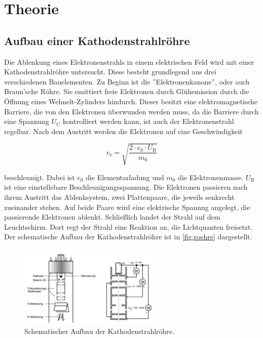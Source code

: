 \section{Theorie}
\label{sec:Theorie}




\subsection{Aufbau einer Kathodenstrahlröhre}
\label{ssec:t1}

Die Ablenkung eines Elektronenstrahls in einem elektrischen Feld wird mit einer Kathodenstrahlröhre untersucht.
Diese besteht grundlegend aus drei verschiedenen Bauelementen.
Zu Beginn ist die ''Elektronenkanone'', oder auch Braun'sche Röhre. Sie emittiert freie Elektronen durch Glühemission durch die Öffnung eines Wehnelt-Zylinders hindurch.
Dieser besitzt eine elektromagnetische Barriere, die von den Elektronen überwunden werden muss, da die Barriere durch eine Spannung $U_\text{C}$ kontrolliert werden kann, ist auch der Elektronenstrahl regelbar.
Nach dem Austritt werden die Elektronen auf eine Geschwindigkeit 

\begin{equation}
    v_\text{z} = \sqrt{\frac{2 \cdot e_0 \cdot U_\text{B}}{m_0}}
    \label{eq:zges}
\end{equation}

beschleunigt.
Dabei ist $e_0$ die Elementarladung und $m_0$ die Elektronenmasse. 
$U_\text{B}$ ist eine einstellebare Beschleunigungsspannung.
Die Elektronen passieren nach ihrem Austritt das Ablenksystem, zwei Plattenpaare, die jeweils senkrecht zueinander stehen.
Auf beide Paare wird eine elektrische Spannng angelegt, die passierende Elektronen ablenkt.
Schließlich landet der Strahl auf dem Leuchtschirm.
Dort regt der Strahl eine Reaktion an, die Lichtquanten freisetzt.
Der schematische Aufbau der Kathodenstrahlröhre ist in \autoref{fig:roehre} dargestellt.

\begin{figure}
    \centering
    \includegraphics[width=0.6\textwidth]{images/bild1.png}
    \caption{Schematischer Aufbau der Kathodenstrahlröhre.\cite{V501}}
    \label{fig:roehre}
\end{figure}

